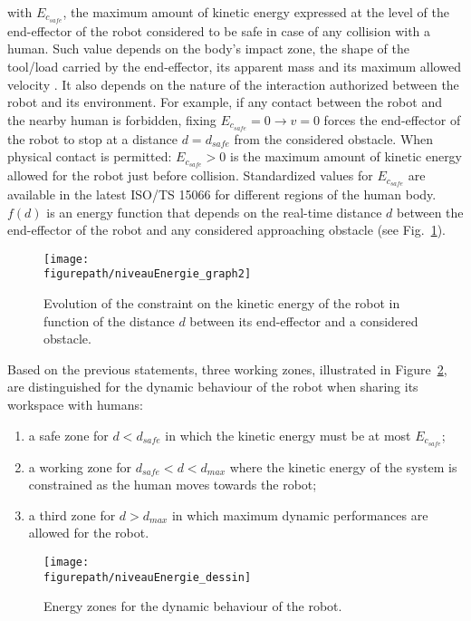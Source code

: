 with $E_{c_{safe}}$, the maximum amount of kinetic energy expressed at the level of the end-effector of the robot considered to be safe in case of any collision with a human. Such value depends on the body's impact zone, the shape of the tool/load carried by the end-effector, its apparent mass and its maximum allowed velocity \cite{haddadin2012truly}. It also depends on the nature of the interaction authorized between the robot and its environment. For example, if any contact between the robot and the nearby human is forbidden, fixing $E_{c_{safe}} = 0 \rightarrow v = 0$ forces the end-effector of the robot to stop at a distance $d = d_{safe}$ from the considered obstacle. When physical contact is permitted: $E_{c_{safe}} > 0$ is the maximum amount of kinetic energy allowed for the robot just before collision. Standardized values for $E_{c_{safe}}$ are available in the latest ISO/TS 15066 \cite{ISO15066PDF} for different regions of the human body. \\
$f(d)$ is an energy function that depends on the real-time distance $d$ between the end-effector of the robot and any considered approaching obstacle (see Fig.~\ref{fig:niveauEnergie2}). 
\begin{figure}
    \centering
	\texttt{[image: \\figurepath/niveauEnergie\_graph2]}
    \caption{Evolution of the constraint on the kinetic energy of the robot in function of the distance $d$ between its end-effector and a considered obstacle.}
    \label{fig:niveauEnergie2}
\end{figure}
Based on the previous statements, three working zones, illustrated in Figure~\ref{fig:niveauEnergie1}, are distinguished for the dynamic behaviour of the robot when sharing its workspace with humans:
\begin{enumerate}
\item a safe zone for $d < d_{safe}$ in which the kinetic energy must be at most $E_{c_{safe}}$;
\item a working zone for $d_{safe} < d < d_{max}$ where the kinetic energy of the system is constrained as the human  moves towards the robot;
\item a third zone for $d > d_{max}$ in which maximum dynamic performances are allowed for the robot.
\end{enumerate}
\begin{figure}[h]
\centering
\texttt{[image: \\figurepath/niveauEnergie\_dessin]}
\caption{Energy zones for the dynamic behaviour of the robot.} 
\label{fig:niveauEnergie1}
\end{figure}

